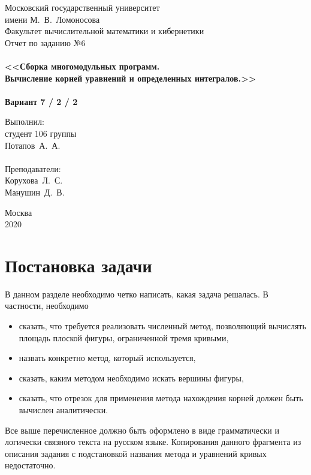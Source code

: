 \documentclass[a4paper,12pt,titlepage,finall]{article}
\begin{document}
\begin{titlepage}
    \begin{center}
	{\small \sc Московский государственный университет \\имени М.~В.~Ломоносова\\
	Факультет вычислительной математики и кибернетики\\}
	\vfill
	{\Large \sc Отчет по заданию №6}\\
	~\\
	{\large \bf <<Сборка многомодульных программ. \\
	Вычисление корней уравнений и определенных интегралов.>>}\\ 
	~\\
	{\large \bf Вариант 7 / 2 / 2}
    \end{center}
    \begin{flushright}
	\vfill {Выполнил:\\
	студент 106 группы\\
	Потапов~А.~А.\\
	~\\
	Преподаватели:\\
	Корухова~Л.~С.\\
    Манушин~Д.~В.}
    \end{flushright}
    \begin{center}
	\vfill
	{\small Москва\\2020}
    \end{center}
\end{titlepage}

\tableofcontents
\newpage

\section{Постановка задачи}

В данном разделе необходимо четко написать, какая задача решалась. В частности, необходимо
\begin{itemize}
\item сказать, что требуется реализовать численный метод, позволяющий вычислять площадь плоской фигуры,
	ограниченной тремя кривыми,
\item назвать конкретно метод, который используется,
\item сказать, каким методом необходимо искать вершины фигуры,
\item сказать, что отрезок для применения метода нахождения корней должен быть вычислен аналитически.
\end{itemize}
Все выше перечисленное должно быть оформлено в виде грамматически и логически
связного текста на русском языке. Копирования данного фрагмента из описания задания 
с подстановкой названия метода и уравнений кривых недостаточно.
\end{document}
